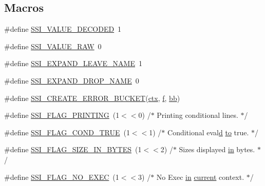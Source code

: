\subsection*{Macros}
\begin{DoxyCompactItemize}
\item 
\#define \hyperlink{group__MOD__INCLUDE_gae5c38885f7e337ce144894fd911cbcc0}{S\+S\+I\+\_\+\+V\+A\+L\+U\+E\+\_\+\+D\+E\+C\+O\+D\+ED}~1
\item 
\#define \hyperlink{group__MOD__INCLUDE_gaa561048dbea878f2ac90e8d23ba182ed}{S\+S\+I\+\_\+\+V\+A\+L\+U\+E\+\_\+\+R\+AW}~0
\item 
\#define \hyperlink{group__MOD__INCLUDE_ga4ec909df77de8b4d260001fc35d59fbb}{S\+S\+I\+\_\+\+E\+X\+P\+A\+N\+D\+\_\+\+L\+E\+A\+V\+E\+\_\+\+N\+A\+ME}~1
\item 
\#define \hyperlink{group__MOD__INCLUDE_ga76a057d11df329ca06532f6ebf922631}{S\+S\+I\+\_\+\+E\+X\+P\+A\+N\+D\+\_\+\+D\+R\+O\+P\+\_\+\+N\+A\+ME}~0
\item 
\#define \hyperlink{group__MOD__INCLUDE_gac6557f46ac9177dd4bfc42238d84558f}{S\+S\+I\+\_\+\+C\+R\+E\+A\+T\+E\+\_\+\+E\+R\+R\+O\+R\+\_\+\+B\+U\+C\+K\+ET}(\hyperlink{group__APR__Util__Bucket__Brigades_ga0525238c5b09cb4ac5067ddec654d09c}{ctx},  \hyperlink{pcregrep_8txt_a588c778c1c1509e472f22dc36efb005e}{f},  \hyperlink{group__MOD__PROXY_ga9313a8a2814cff280d5d780c723def3c}{bb})
\item 
\#define \hyperlink{group__MOD__INCLUDE_ga1af16fe6177d853075fe19cdaa3b6952}{S\+S\+I\+\_\+\+F\+L\+A\+G\+\_\+\+P\+R\+I\+N\+T\+I\+NG}~(1$<$$<$0)  /$\ast$ Printing conditional lines. $\ast$/
\item 
\#define \hyperlink{group__MOD__INCLUDE_ga4e2c3fd76b1c1eda9e721d37cd4496df}{S\+S\+I\+\_\+\+F\+L\+A\+G\+\_\+\+C\+O\+N\+D\+\_\+\+T\+R\+UE}~(1$<$$<$1)  /$\ast$ Conditional eval\textquotesingle{}\hyperlink{apr__siphash_8h_a105cb8ad09be3a7d9d15497ce529ccce}{d} \hyperlink{pcretest_8txt_aa22c98f630e4b3fe86ee17ce5150c62f}{to} true. $\ast$/
\item 
\#define \hyperlink{group__MOD__INCLUDE_gaf3c30794f5eeba35a248670c5172f92f}{S\+S\+I\+\_\+\+F\+L\+A\+G\+\_\+\+S\+I\+Z\+E\+\_\+\+I\+N\+\_\+\+B\+Y\+T\+ES}~(1$<$$<$2)  /$\ast$ Sizes displayed \hyperlink{group__apr__thread__proc_ga2e46fea00cc2238744ebca5061c62bcc}{in} bytes.   $\ast$/
\item 
\#define \hyperlink{group__MOD__INCLUDE_gaff68df053f82f7f4f1966f7b832352c0}{S\+S\+I\+\_\+\+F\+L\+A\+G\+\_\+\+N\+O\+\_\+\+E\+X\+EC}~(1$<$$<$3)  /$\ast$ No Exec \hyperlink{group__apr__thread__proc_ga2e46fea00cc2238744ebca5061c62bcc}{in} \hyperlink{group__APACHE__CORE__CONFIG_ga4b3e87cb39cac2296c5083f27321f1f4}{current} context. $\ast$/

\end{DoxyCompactItemize}

